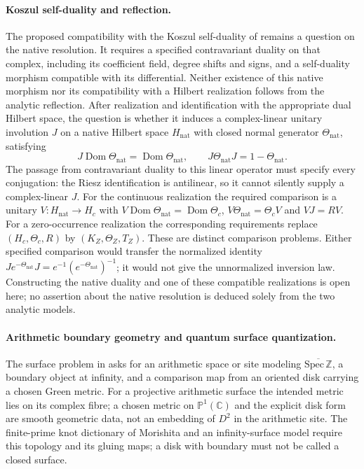\paragraph{Koszul self-duality and reflection.}
\label{v4-arith:pres90:koszul-reflection}
The proposed compatibility with the Koszul self-duality of
 remains a question on the native
resolution. It requires a specified contravariant duality on that
complex, including its coefficient field, degree shifts and signs,
and a self-duality morphism compatible with its differential.
Neither existence of this native morphism nor its compatibility
with a Hilbert realization follows from the analytic reflection.
After realization and identification with the appropriate dual
Hilbert space, the question is whether it induces a complex-linear
unitary involution $J$ on a native Hilbert space $H_{\mathrm{nat}}$
with closed normal generator $\Theta_{\mathrm{nat}}$, satisfying
\[
 J\operatorname{Dom}\Theta_{\mathrm{nat}}
 =\operatorname{Dom}\Theta_{\mathrm{nat}},\qquad
 J\Theta_{\mathrm{nat}}J=1-\Theta_{\mathrm{nat}}.
\]
The passage from contravariant duality to this linear operator must
specify every conjugation: the Riesz identification is antilinear,
so it cannot silently supply a complex-linear $J$.
For the continuous realization the required comparison is a unitary
$V:H_{\mathrm{nat}}\to H_c$ with
$V\operatorname{Dom}\Theta_{\mathrm{nat}}=\operatorname{Dom}\Theta_c$,
$V\Theta_{\mathrm{nat}}=\Theta_cV$ and $VJ=RV$.
For a zero-occurrence realization the corresponding requirements
replace $(H_c,\Theta_c,R)$ by $(K_Z,\Theta_Z,T_Z)$.
These are distinct comparison problems. Either specified comparison
would transfer the normalized identity
$Je^{-\Theta_{\mathrm{nat}}}J=e^{-1}(e^{-\Theta_{\mathrm{nat}}})^{-1}$;
it would not give the unnormalized inversion law.
Constructing the native duality and one of these compatible
realizations is open here; no assertion about the native resolution
is deduced solely from the two analytic models.

\paragraph{Arithmetic boundary geometry and quantum surface quantization.}
\label{v4-arith:pres90:quantization}
The surface problem in  asks for an
arithmetic space or site modeling $\overline{\mathrm{Spec}\,\mathbb Z}$,
a boundary object at infinity, and a comparison map from an oriented
disk carrying a chosen Green metric. For a projective arithmetic
surface the intended metric lies on its complex fibre; a chosen
metric on $\mathbb P^1(\mathbb C)$ and the explicit disk form are
smooth geometric data, not an embedding of $D^2$ in the arithmetic site.
The finite-prime knot dictionary of Morishita and an infinity-surface
model require this topology and its gluing maps; a disk with boundary
must not be called a closed surface.

